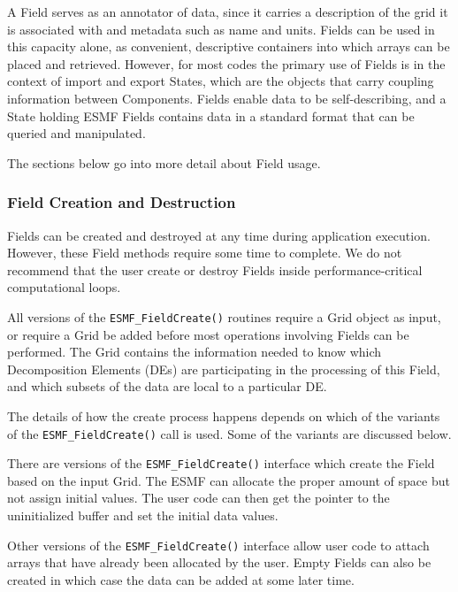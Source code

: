 

A Field serves as an annotator of data, since it carries 
a description of the grid it is associated with and metadata 
such as name and units.  Fields can be used in this capacity
alone, as convenient, descriptive containers into which arrays 
can be placed and retrieved.  However, for most codes the primary 
use of Fields is in the context of import and export States,
which are the objects that carry coupling information between 
Components.  Fields enable data to be self-describing, and a
State holding ESMF Fields contains data in a standard format
that can be queried and manipulated.  

The sections below go into more detail about Field usage.

\subsubsection{Field Creation and Destruction}

Fields can be created and destroyed at any time during 
application execution.  However, these Field methods require 
some time to complete.  We do not recommend that the user
create or destroy Fields inside performance-critical 
computational loops.

All versions of the {\tt ESMF\_FieldCreate()} 
routines require a Grid object as input, or require a Grid
be added before most operations involving Fields can be performed.
The Grid contains the information needed to know which 
Decomposition Elements (DEs) are participating in 
the processing of this Field, and which subsets of the data
are local to a particular DE.

The details of how the create process happens depends 
on which of the variants of the {\tt ESMF\_FieldCreate()} 
call is used.  Some of the variants are discussed below.

There are versions of the {\tt ESMF\_FieldCreate()} interface
which create the Field based on the input Grid.  The ESMF
can allocate the proper amount of 
space but not assign initial values.  The user code
can then get the pointer to the uninitialized buffer and 
set the initial data values.

Other versions of the {\tt ESMF\_FieldCreate()} interface
allow user code to attach arrays that have already been
allocated by the user.  Empty Fields can also be created in
which case the data can be added at some later time.

